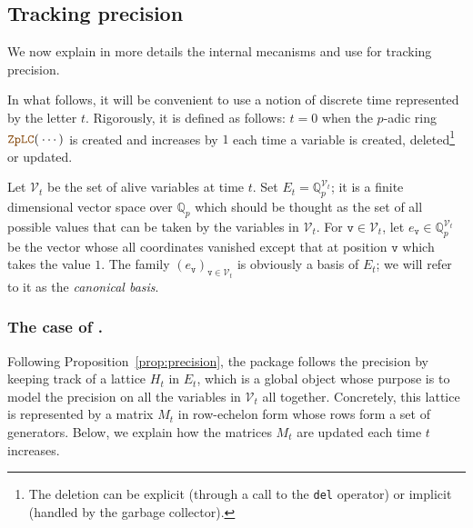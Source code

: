 \documentclass[sigconf]{acmart}
\newcommand{\Q}{\mathbb Q}
\newcommand{\Qp}{\Q_p}
\newcommand{\OK}{\mathcal{O}_K}
\newcommand{\calV}{\mathcal{V}}
\newcommand{\ttv}{\texttt{v}\xspace}
\newcommand{\ZpLC}{\text{\color{output} \rm \tt ZpLC}\xspace}
\newcommand{\ZpLF}{\text{\color{output} \rm \tt ZpLF}\xspace}
\newtheorem{prop}[theo]{Proposition}
\theoremstyle{definition}
\begin{document}
%

\subsection{Tracking precision}
\label{ssec:trackprec}

We now explain in more details the internal mecanisms \ZpLC and \ZpLF 
use for tracking precision. 

In what follows, it will be convenient to use a notion of discrete time 
represented by the letter $t$. Rigorously, it is defined as follows: 
$t=0$ when the $p$-adic ring $\ZpLC(\:\cdots)$ is created and increases by 
$1$ each time a variable is created, deleted\footnote{The deletion can
be explicit (through a call to the \texttt{del} operator) or implicit
(handled by the garbage collector).} or updated.

Let $\calV_t$ be the set of alive variables at time $t$. Set $E_t = 
\Qp^{\calV_t}$; it is a finite dimensional vector space over $\Qp$ which 
should be thought as the set of all possible values that can be taken by 
the variables in $\calV_t$. For $\ttv \in \calV_t$, let $e_\ttv \in
\Qp^{\calV_t}$ be the vector whose all coordinates vanished except 
that at position $\ttv$ which takes the value $1$. The family 
$(e_\ttv)_{\ttv \in \calV_t}$ is obviously a basis of $E_t$; we will 
refer to it as the \emph{canonical basis}.

\subsubsection{The case of \ZpLC.}

Following Proposition~\ref{prop:precision},
the package \ZpLC follows the precision by keeping track of a lattice
$H_t$ in $E_t$, which is a global object whose purpose is to model the 
precision on all the variables in $\calV_t$ all together.
Concretely, this lattice is represented by a matrix $M_t$ in row-echelon 
form whose rows form a set of generators.
Below, we explain how the matrices $M_t$ are updated each time
$t$ increases.
\end{document}
